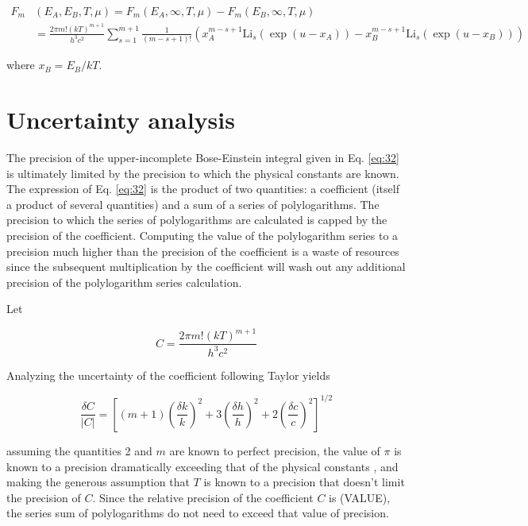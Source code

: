 \documentclass[letterpaper,12pt]{article}
\newcommand{\Li}{\textrm{Li}}
\begin{document}
\begin{align} \label{eq:33}
F_{m}&(E_{A}, E_{B}, T, \mu) = F_{m}(E_{A}, \infty, T, \mu) - F_{m}(E_{B}, \infty, T, \mu) \nonumber \\
 &= \frac{2\pi m! (kT)^{m+1}}{h^{3} c^{2}} \sum_{s = 1}^{m+1} \frac{1}{(m-s+1)!} \left( x_{A}^{m-s+1} \Li_{s} \left( \exp(u-x_{A}) \right) - x_{B}^{m-s+1} \Li_{s} \left( \exp(u-x_{B}) \right)
\right)
\end{align}

\noindent where $x_{B} = E_{B}/kT$.


\section{Uncertainty analysis}
The precision of the upper-incomplete Bose-Einstein integral given in Eq. \ref{eq:32} is ultimately limited by the precision to which the physical constants are known. The expression of Eq. \ref{eq:32} is the product of two quantities: a coefficient (itself a product of several quantities) and a sum of a series of polylogarithms. The precision to which the series of polylogarithms are calculated is capped by the precision of the coefficient. Computing the value of the polylogarithm series to a precision much higher than the precision of the coefficient is a waste of resources since the subsequent multiplication by the coefficient will wash out any additional precision of the polylogarithm series calculation.

Let

\begin{equation} \label{eq:52}
C = \frac{2 \pi m! (kT)^{m+1}}{h^{3}c^{2}}
\end{equation}

\noindent Analyzing the uncertainty of the coefficient following Taylor \cite{9780935702422} yields

\begin{equation} \label{eq:53}
\frac{\delta C}{|C|} = \left[ (m+1) \left( \frac{\delta k}{k} \right)^{2} + 3 \left( \frac{\delta h}{h} \right)^{2} + 2 \left( \frac{\delta c}{c} \right)^{2} \right]^{1/2}
\end{equation}

\noindent assuming the quantities 2 and $m$ are known to perfect precision, the value of $\pi$ is known to a precision dramatically exceeding that of the physical constants \cite{}, and making the generous assumption that $T$ is known to a precision that doesn't limit the precision of $C$. Since the relative precision of the coefficient $C$ is (VALUE), the series sum of polylogarithms do not need to exceed that value of precision.
\end{document}
